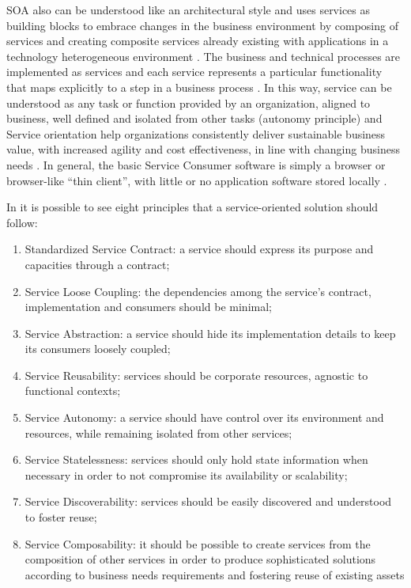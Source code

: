 \acrshort{SOA} also can be understood like an architectural style and uses services as building blocks to embrace changes in the business environment by composing of services and creating composite services already existing with applications in a technology heterogeneous environment \cite{Shahrbanoo2012,Sloane2008a}. The business and technical processes are implemented as services and each service represents a particular functionality that maps explicitly to a step in a business process \cite{Arsanjani2006a2006}. In this way, service can be understood as any task or function provided by an organization, aligned to business, well defined and isolated from other tasks (autonomy principle) \cite{erl2008soa} and Service orientation help organizations consistently deliver sustainable business value, with increased agility and cost effectiveness, in line with changing business needs \cite{arsanjani2009soa}. In general, the basic Service Consumer software is simply a browser or browser-like ``thin client'', with little or no application software stored locally \cite{Sloane2008a}.

In \citet{erl2008soa} it is possible to see eight principles that a service-oriented solution should follow: 
\begin{enumerate}
\item Standardized Service Contract: a service should express its purpose and capacities through a contract;
\item Service Loose Coupling: the dependencies among the service’s contract, implementation and consumers should be minimal;
\item Service Abstraction: a service should hide its implementation details to keep its consumers loosely coupled;
\item Service Reusability: services should be corporate resources, agnostic to functional contexts;
\item Service Autonomy: a service should have control over its environment and resources, while remaining isolated from other services;
\item Service Statelessness: services should only hold state information when necessary in order to not compromise its availability or scalability; 
\item Service Discoverability: services should be easily discovered and understood to foster reuse;
\item Service Composability: it should be possible to create services from the composition of other services in order to produce sophisticated solutions according to business needs requirements and fostering reuse of existing assets 
\end{enumerate}

